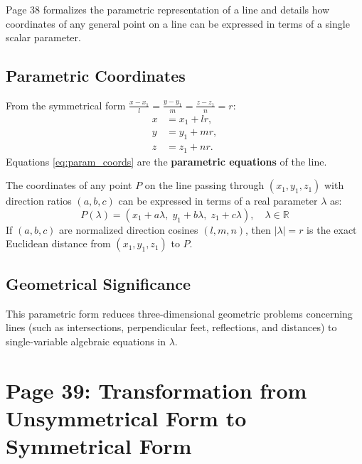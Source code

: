 \begin{conceptbox}
Page 38 formalizes the parametric representation of a line and details how coordinates of any general point on a line can be expressed in terms of a single scalar parameter.
\end{conceptbox}

\subsection{Parametric Coordinates}
From the symmetrical form $\frac{x - x_1}{l} = \frac{y - y_1}{m} = \frac{z - z_1}{n} = r$:
\begin{align}
    x &= x_1 + lr, \nonumber\\
    y &= y_1 + mr, \nonumber\\
    z &= z_1 + nr. \label{eq:param_coords}
\end{align}
Equations \eqref{eq:param_coords} are the \textbf{parametric equations} of the line.

\begin{theorembox}
The coordinates of any point $P$ on the line passing through $(x_1, y_1, z_1)$ with direction ratios $(a, b, c)$ can be expressed in terms of a real parameter $\lambda$ as:
\begin{equation}
    \boxed{P(\lambda) = (x_1 + a\lambda, \; y_1 + b\lambda, \; z_1 + c\lambda), \quad \lambda \in \mathbb{R}}
\end{equation}
If $(a, b, c)$ are normalized direction cosines $(l, m, n)$, then $|\lambda| = r$ is the exact Euclidean distance from $(x_1, y_1, z_1)$ to $P$.
\end{theorembox}

\subsection{Geometrical Significance}
This parametric form reduces three-dimensional geometric problems concerning lines (such as intersections, perpendicular feet, reflections, and distances) to single-variable algebraic equations in $\lambda$.

\section{Page 39: Transformation from Unsymmetrical Form to Symmetrical Form}
\label{sec:page39}

